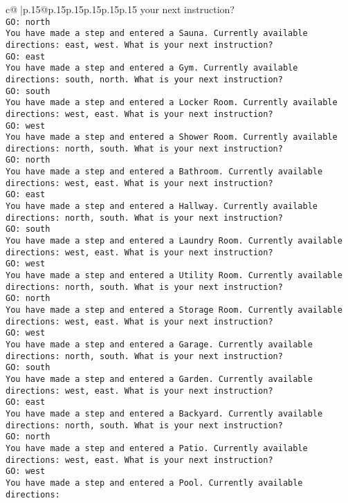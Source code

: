\documentclass{article}
\begin{document}
{\begin{supertabular}{c@{$\;$}|p{.15\linewidth}@{}p{.15\linewidth}p{.15\linewidth}p{.15\linewidth}p{.15\linewidth}p{.15\linewidth}}
{{{your next instruction?\\ \tt GO: north\\ \tt You have made a step and entered a Sauna. Currently available directions: east, west. What is your next instruction?\\ \tt GO: east\\ \tt You have made a step and entered a Gym. Currently available directions: south, north. What is your next instruction?\\ \tt GO: south\\ \tt You have made a step and entered a Locker Room. Currently available directions: west, east. What is your next instruction?\\ \tt GO: west\\ \tt You have made a step and entered a Shower Room. Currently available directions: north, south. What is your next instruction?\\ \tt GO: north\\ \tt You have made a step and entered a Bathroom. Currently available directions: west, east. What is your next instruction?\\ \tt GO: east\\ \tt You have made a step and entered a Hallway. Currently available directions: north, south. What is your next instruction?\\ \tt GO: south\\ \tt You have made a step and entered a Laundry Room. Currently available directions: west, east. What is your next instruction?\\ \tt GO: west\\ \tt You have made a step and entered a Utility Room. Currently available directions: north, south. What is your next instruction?\\ \tt GO: north\\ \tt You have made a step and entered a Storage Room. Currently available directions: west, east. What is your next instruction?\\ \tt GO: west\\ \tt You have made a step and entered a Garage. Currently available directions: north, south. What is your next instruction?\\ \tt GO: south\\ \tt You have made a step and entered a Garden. Currently available directions: west, east. What is your next instruction?\\ \tt GO: east\\ \tt You have made a step and entered a Backyard. Currently available directions: north, south. What is your next instruction?\\ \tt GO: north\\ \tt You have made a step and entered a Patio. Currently available directions: west, east. What is your next instruction?\\ \tt GO: west\\ \tt You have made a step and entered a Pool. Currently available directions: }}}
\end{supertabular}}
\end{document}
